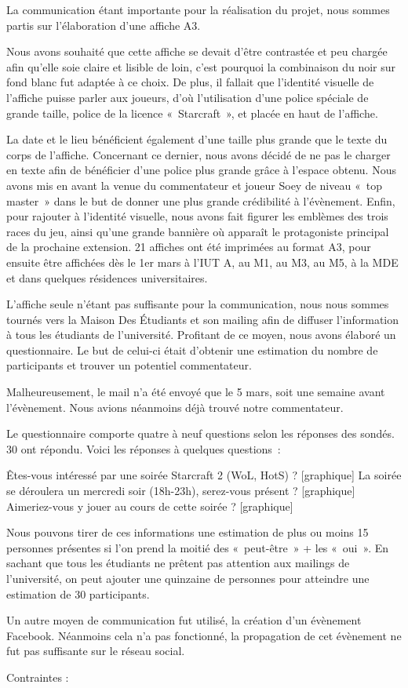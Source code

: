 	La communication étant importante pour la réalisation du projet, nous sommes partis sur l'élaboration
d'une affiche A3.

	Nous avons souhaité que cette affiche se devait d’être contrastée et peu chargée afin qu’elle soie
claire et lisible de loin, c’est pourquoi la combinaison du noir sur fond blanc fut adaptée à ce choix.
De plus, il fallait que l’identité visuelle de l’affiche puisse parler aux joueurs, d’où l’utilisation
d’une police spéciale de grande taille, police de la licence « Starcraft », et placée en haut de l’affiche.

	La date et le lieu bénéficient également d’une taille plus grande que le texte du corps de l’affiche.
Concernant ce dernier, nous avons décidé de ne pas le charger en texte afin de bénéficier d’une police
plus grande grâce à l’espace obtenu.
	Nous avons mis en avant la venue du commentateur et joueur Soey  de niveau « top master »  dans le but
de donner une plus grande crédibilité à l’évènement.
	Enfin, pour rajouter à l’identité visuelle, nous avons fait figurer  les emblèmes des trois races du jeu,
ainsi qu’une grande bannière où apparaît le protagoniste principal de la prochaine extension.
21 affiches ont été imprimées au format A3, pour ensuite être affichées dès le 1er mars à l’IUT A, au M1,
au M3, au M5, à la MDE et dans quelques résidences universitaires.

	L’affiche seule n’étant pas suffisante pour la communication, nous nous sommes tournés vers la
Maison Des Étudiants et son mailing afin de diffuser l’information à tous les étudiants de l’université.
Profitant de ce moyen, nous avons élaboré un questionnaire. Le but de celui-ci était d’obtenir une estimation
du nombre de participants et trouver un potentiel commentateur.

	Malheureusement, le mail n’a été envoyé que le 5 mars, soit une semaine avant l’évènement.
Nous avions néanmoins déjà trouvé notre commentateur.

Le questionnaire comporte quatre à neuf questions selon les réponses des sondés. 30 ont répondu.
Voici les réponses à quelques questions :


Êtes-vous intéressé par une soirée Starcraft 2 (WoL, HotS) ?
[graphique]
La soirée se déroulera un mercredi soir (18h-23h), serez-vous présent ?
[graphique]
Aimeriez-vous y jouer au cours de cette soirée ?
[graphique]

	Nous pouvons tirer de ces informations une estimation de plus ou moins 15 personnes présentes si l’on prend
la moitié des « peut-être » + les « oui ».
	En sachant que tous les étudiants ne prêtent pas attention aux mailings de l’université, on peut ajouter
une quinzaine de personnes pour atteindre une estimation de 30 participants.

	Un autre moyen de communication fut utilisé, la création d'un évènement Facebook. Néanmoins cela n'a pas fonctionné,
la propagation de cet évènement ne fut pas suffisante sur le réseau social.


Contraintes :

